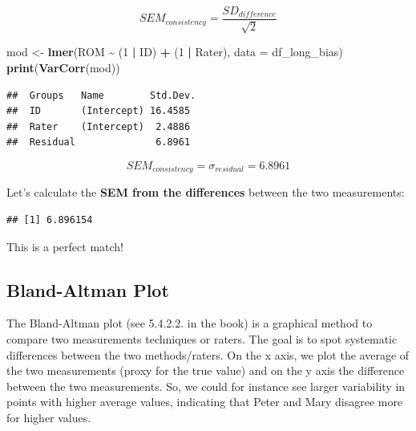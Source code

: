 \documentclass[
]{book}
\newenvironment{Shaded}{\begin{snugshade}}{\end{snugshade}}
\newcommand{\AttributeTok}[1]{\textcolor[rgb]{0.13,0.29,0.53}{#1}}
\newcommand{\CommentTok}[1]{\textcolor[rgb]{0.56,0.35,0.01}{\textit{#1}}}
\newcommand{\DecValTok}[1]{\textcolor[rgb]{0.00,0.00,0.81}{#1}}
\newcommand{\FunctionTok}[1]{\textcolor[rgb]{0.13,0.29,0.53}{\textbf{#1}}}
\newcommand{\NormalTok}[1]{#1}
\newcommand{\OtherTok}[1]{\textcolor[rgb]{0.56,0.35,0.01}{#1}}
\newcommand{\SpecialCharTok}[1]{\textcolor[rgb]{0.81,0.36,0.00}{\textbf{#1}}}
\newcommand{\StringTok}[1]{\textcolor[rgb]{0.31,0.60,0.02}{#1}}
\begin{document}
\[SEM_{consistency} = \frac{SD_{difference}}{\sqrt{2}}\]

\begin{Shaded}
\begin{Highlighting}[]
\NormalTok{mod }\OtherTok{\textless{}{-}} \FunctionTok{lmer}\NormalTok{(ROM }\SpecialCharTok{\textasciitilde{}}\NormalTok{ (}\DecValTok{1} \SpecialCharTok{|}\NormalTok{ ID) }\SpecialCharTok{+}\NormalTok{ (}\DecValTok{1} \SpecialCharTok{|}\NormalTok{ Rater), }\AttributeTok{data =}\NormalTok{ df\_long\_bias)}
\FunctionTok{print}\NormalTok{(}\FunctionTok{VarCorr}\NormalTok{(mod))}
\end{Highlighting}
\end{Shaded}

\begin{verbatim}
##  Groups   Name        Std.Dev.
##  ID       (Intercept) 16.4585 
##  Rater    (Intercept)  2.4886 
##  Residual              6.8961
\end{verbatim}

\[SEM_{consistency} = \sigma_{residual} = 6.8961\]

Let's calculate the \textbf{SEM from the differences} between the two measurements:

\begin{Shaded}
\end{Shaded}

\begin{verbatim}
## [1] 6.896154
\end{verbatim}

This is a perfect match!

\subsection{Bland-Altman Plot}\label{bland-altman-plot}

The Bland-Altman plot (see 5.4.2.2. in the book) is a graphical method to compare
two measurements techniques or raters. The goal is to spot systematic differences
between the two
methods/raters. On the x axis, we plot the average of the two measurements (proxy for the true value)
and on the y axis the difference between the two measurements. So, we could
for instance see larger variability in points with higher average values,
indicating that Peter and Mary disagree more for higher values.
\end{document}
